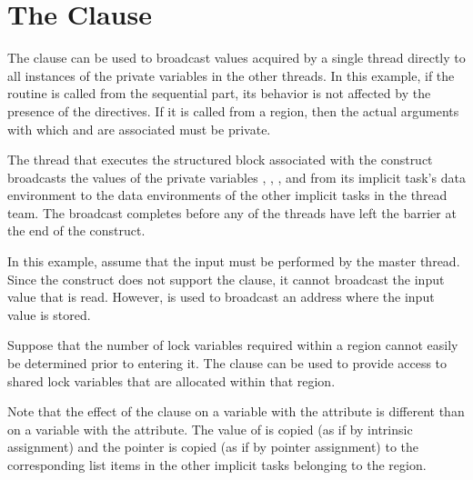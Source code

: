 \pagebreak
\section{The  Clause}
\label{sec:copyprivate}

The  clause can be used to broadcast values acquired by a single 
thread directly to all instances of the private variables in the other threads. 
In this example, if the routine is called from the sequential part, its behavior 
is not affected by the presence of the directives. If it is called from a  
region, then the actual arguments with which  and  are associated 
must be private. 

The thread that executes the structured block associated with the  
 construct broadcasts the values of the private variables , , 
, and 
 from its implicit task's data environment to the data environments 
of the other implicit tasks in the thread team. The broadcast completes before 
any of the threads have left the barrier at the end of the construct.



In this example, assume that the input must be performed by the master thread. 
Since the  construct does not support the  clause, 
it cannot broadcast the input value that is read. However,  
is used to broadcast an address where the input value is stored.



Suppose that the number of lock variables required within a  region 
cannot easily be determined prior to entering it. The  clause 
can be used to provide access to shared lock variables that are allocated within 
that  region.


\fortranspecificstart
{}

Note that the effect of the  clause on a variable with the 
 attribute is different than on a variable with the  
attribute. The value of  is copied (as if by intrinsic assignment) and 
the pointer  is copied (as if by pointer assignment) to the corresponding 
list items in the other implicit tasks belonging to the  region. 

\fortranspecificend


